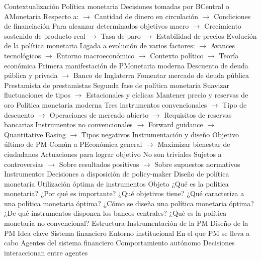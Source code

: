 \documentclass{nuevotema}
\begin{document}
\esquemalargo

\begin{esquemal}
	\1[] 
		\2 Contextualización
			\3 Política monetaria
				\4 Decisiones tomadas por BCentral o AMonetaria
				\4[] Respecto a:
				\4[] $\to$ Cantidad de dinero en circulación
				\4[] $\to$ Condiciones de financiación
				\4 Para alcanzar determinados objetivos macro
				\4[] $\to$ Crecimiento sostenido de producto real
				\4[] $\to$ Tasa de paro
				\4[] $\to$ Estabilidad de precios
			\3 Evolución de la política monetaria
				\4 Ligada a evolución de varios factores:
				\4[] $\to$ Avances tecnológicos
				\4[] $\to$ Entorno macroeconómico
				\4[] $\to$ Contexto político
				\4[] $\to$ Teoría económica
				\4 Primera manifestación de PMonetaria moderna
				\4[] Descuento de deuda pública y privada
				\4[] $\to$ Banco de Inglaterra
				\4[] Fomentar mercado de deuda pública
				\4[] Prestamista de prestamistas
				\4 Segunda fase de política monetaria
				\4[] Suavizar fluctuaciones de tipos
				\4[] $\to$ Estacionales y cíclicas
				\4[] Mantener precio y reservas de oro
				\4 Política monetaria moderna
				\4[] Tres instrumentos convencionales
				\4[] $\to$ Tipo de descuento
				\4[] $\to$ Operaciones de mercado abierto
				\4[] $\to$ Requisitos de reservas bancarias
				\4[] Instrumentos no convencionales
				\4[] $\to$ Forward guidance
				\4[] $\to$ Quantitative Easing
				\4[] $\to$ Tipos negativos
			\3 Instrumentación y diseño
				\4 Objetivo último de PM
				\4[] Común a PEconómica general
				\4[] $\to$ Maximizar bienestar de ciudadanos
				\4 Actuaciones para lograr objetivo
				\4[] No son triviales
				\4[] Sujetos a controversias
				\4[] $\to$ Sobre resultados positivos
				\4[] $\to$ Sobre supuestos normativos
				\4 Instrumentos
				\4[] Decisiones a disposición de policy-maker
				\4 Diseño de política monetaria
				\4[] Utilización óptima de instrumentos
		\2 Objeto
			\3 ¿Qué es la política monetaria? ¿Por qué es importante?
			\3 ¿Qué objetivos tiene?
			\3 ¿Qué caracteriza a una política monetaria óptima?
			\3 ¿Cómo se diseña una política monetaria óptima?
			\3 ¿De qué instrumentos disponen los bancos centrales?
			\3 ¿Qué es la política monetaria no convencional?
		\2 Estructura
			\3 Instrumentación de la PM
			\3 Diseño de la PM
	\1 
		\2 Idea clave
			\3 Sistema financiero
				\4 Entorno institucional
				\4[] En el que PM se lleva a cabo
				\4 Agentes del sistema financiero
				\4[] Comportamiento autónomo
				\4[] Decisiones interaccionan entre agentes

\end{esquemal}
\end{document}
